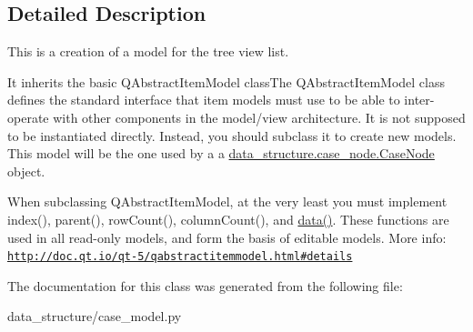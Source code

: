 \subsection{Detailed Description}
This is a creation of a model for the tree view list. 

It inherits the basic Q\+Abstract\+Item\+Model class\+The Q\+Abstract\+Item\+Model class defines the standard interface that item models must use to be able to inter-\/operate with other components in the model/view architecture. It is not supposed to be instantiated directly. Instead, you should subclass it to create new models. This model will be the one used by a a \hyperlink{a00087}{data\+\_\+structure.\+case\+\_\+node.\+Case\+Node} object.

When subclassing Q\+Abstract\+Item\+Model, at the very least you must implement index(), parent(), row\+Count(), column\+Count(), and \hyperlink{a00083_a2f7291849d0efb3d7cff499d1cde0bf6}{data()}. These functions are used in all read-\/only models, and form the basis of editable models. More info\+: \href{http://doc.qt.io/qt-5/qabstractitemmodel.html#details}{\tt http\+://doc.\+qt.\+io/qt-\/5/qabstractitemmodel.\+html\#details} 

The documentation for this class was generated from the following file\+:\begin{DoxyCompactItemize}
\item 
data\+\_\+structure/case\+\_\+model.\+py\end{DoxyCompactItemize}
